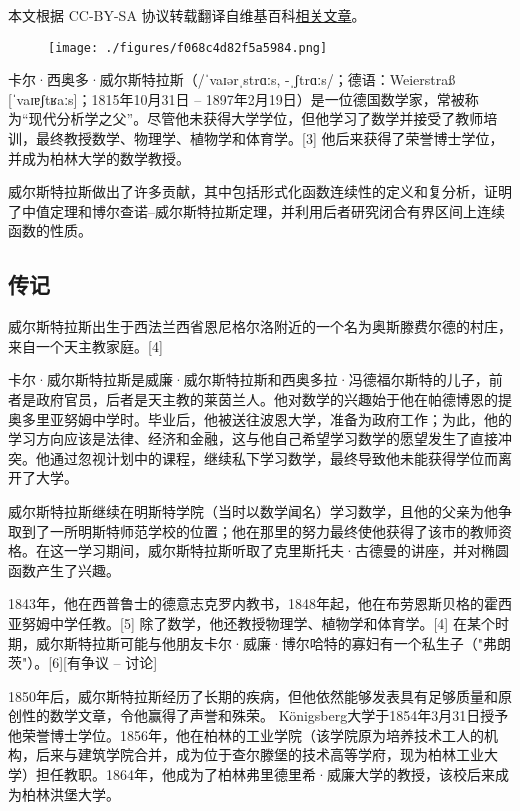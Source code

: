 
本文根据 CC-BY-SA 协议转载翻译自维基百科\href{https://en.wikipedia.org/wiki/Karl_Weierstrass}{相关文章}。
\begin{figure}[ht]
\centering
\texttt{[image: ./figures/f068c4d82f5a5984.png]}
\caption{} \label{fig_Karl_1}
\end{figure}
卡尔·西奥多·威尔斯特拉斯（/ˈvaɪərˌstrɑːs, -ˌʃtrɑːs/；德语：Weierstraß [ˈvaɪɐʃtʁaːs]；1815年10月31日 – 1897年2月19日）是一位德国数学家，常被称为“现代分析学之父”。尽管他未获得大学学位，但他学习了数学并接受了教师培训，最终教授数学、物理学、植物学和体育学。[3] 他后来获得了荣誉博士学位，并成为柏林大学的数学教授。

威尔斯特拉斯做出了许多贡献，其中包括形式化函数连续性的定义和复分析，证明了中值定理和博尔查诺–威尔斯特拉斯定理，并利用后者研究闭合有界区间上连续函数的性质。
\subsection{传记}
威尔斯特拉斯出生于西法兰西省恩尼格尔洛附近的一个名为奥斯滕费尔德的村庄，来自一个天主教家庭。[4]

卡尔·威尔斯特拉斯是威廉·威尔斯特拉斯和西奥多拉·冯德福尔斯特的儿子，前者是政府官员，后者是天主教的莱茵兰人。他对数学的兴趣始于他在帕德博恩的提奥多里亚努姆中学时。毕业后，他被送往波恩大学，准备为政府工作；为此，他的学习方向应该是法律、经济和金融，这与他自己希望学习数学的愿望发生了直接冲突。他通过忽视计划中的课程，继续私下学习数学，最终导致他未能获得学位而离开了大学。

威尔斯特拉斯继续在明斯特学院（当时以数学闻名）学习数学，且他的父亲为他争取到了一所明斯特师范学校的位置；他在那里的努力最终使他获得了该市的教师资格。在这一学习期间，威尔斯特拉斯听取了克里斯托夫·古德曼的讲座，并对椭圆函数产生了兴趣。

1843年，他在西普鲁士的德意志克罗内教书，1848年起，他在布劳恩斯贝格的霍西亚努姆中学任教。[5] 除了数学，他还教授物理学、植物学和体育学。[4] 在某个时期，威尔斯特拉斯可能与他朋友卡尔·威廉·博尔哈特的寡妇有一个私生子（"弗朗茨"）。[6][有争议 – 讨论]

1850年后，威尔斯特拉斯经历了长期的疾病，但他依然能够发表具有足够质量和原创性的数学文章，令他赢得了声誉和殊荣。 Königsberg大学于1854年3月31日授予他荣誉博士学位。1856年，他在柏林的工业学院（该学院原为培养技术工人的机构，后来与建筑学院合并，成为位于查尔滕堡的技术高等学府，现为柏林工业大学）担任教职。1864年，他成为了柏林弗里德里希·威廉大学的教授，该校后来成为柏林洪堡大学。

